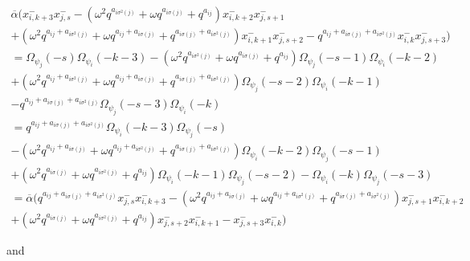 \documentclass[12pt]{amsart}
\numberwithin{equation}{section}
\begin{document}
    \begin{multline*}
        \overline{\alpha}(x_{i,k+3}^-x_{j,s}^- - (\omega^2q^{a_{i\sigma^2(j)}} + \omega q^{a_{i\sigma(j)}} + q^{a_{ij}})x_{i,k+2}^-x_{j,s+1}^-\\
    +  (\omega^2q^{a_{ij} + a_{i\sigma^2(j)}} + \omega q^{a_{ij} + a_{i\sigma(j)}} + q^{a_{i\sigma(j)} + a_{i\sigma^2(j)}})x_{i,k+1}^-x_{j,s+2}^- - q^{a_{ij} + a_{i\sigma(j)} + a_{i\sigma^2(j)}}x_{i,k}^-x_{j,s+3}^- )\\
        = \Omega_{\psi_j}(-s)\Omega_{\psi_i}(-k-3) - (\omega^2q^{a_{i\sigma^2(j)}} + \omega q^{a_{i\sigma(j)}} + q^{a_{ij}})\Omega_{\psi_j}(-s-1)\Omega_{\psi_i}(-k-2)\\
        +  (\omega^2q^{a_{ij} + a_{i\sigma^2(j)}} + \omega q^{a_{ij} + a_{i\sigma(j)}} + q^{a_{i\sigma(j)} + a_{i\sigma^2(j)}})\Omega_{\psi_j}(-s-2)\Omega_{\psi_i}(-k-1) \\
        - q^{a_{ij} + a_{i\sigma(j)} + a_{i\sigma^2(j)}}\Omega_{\psi_j}(-s-3)\Omega_{\psi_i}(-k)\\
        =q^{a_{ij} + a_{i\sigma(j)} + a_{i\sigma^2(j)}}\Omega_{\psi_i}(-k-3)\Omega_{\psi_j}(-s) \\
        - (\omega^2q^{a_{ij} + a_{i\sigma(j)}} + \omega q^{a_{ij} + a_{i\sigma^2(j)}} + q^{a_{i\sigma(j)} + a_{i\sigma^2(j)}})\Omega_{\psi_i}(-k-2)\Omega_{\psi_j}(-s-1) \\
        + (\omega^2q^{a_{i\sigma(j)}} + \omega q^{a_{i\sigma^2(j)}} + q^{a_{ij}})\Omega_{\psi_i}(-k-1)\Omega_{\psi_j}(-s-2) - \Omega_{\psi_i}(-k)\Omega_{\psi_j}(-s-3)\\
        = \overline{\alpha}(q^{a_{ij} + a_{i\sigma(j)} + a_{i\sigma^2(j)}}x_{j,s}^-x_{i,k+3}^- - (\omega^2q^{a_{ij} + a_{i\sigma(j)}} + \omega q^{a_{ij} + a_{i\sigma^2(j)}} + q^{a_{i\sigma(j)} + a_{i\sigma^2(j)}})x_{j,s+1}^-x_{i,k+2}^-\\
        + (\omega^2q^{a_{i\sigma(j)}} + \omega q^{a_{i\sigma^2(j)}} + q^{a_{ij}})x_{j,s+2}^-x_{i,k+1}^- -x_{j,s+3}^-x_{i,k}^-)
    \end{multline*}

    and 
\end{document}

